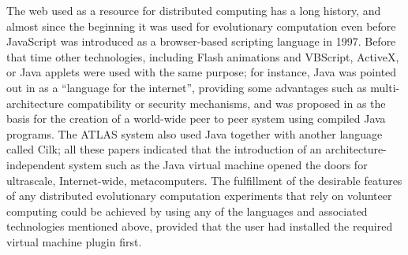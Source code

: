 \documentclass{sig-alternate}
\begin{document}
The web used as a resource for distributed computing has a
long history, and almost since the beginning it was used for
evolutionary computation even before JavaScript was
introduced as a browser-based scripting language in 1997. Before that
time other technologies,
 including Flash animations and VBScript, ActiveX, or Java applets were
used with the same purpose; for instance, Java was pointed out in \cite{soares1998get} as a
``language for the internet'', providing some advantages such as multi-architecture compatibility or
security mechanisms, and was proposed in \cite{chandy1996world} as the
basis for the creation of a world-wide peer to peer system using compiled Java
programs. The ATLAS system
\cite{Baldeschwieler:1996:TIG:504450.504482} also used Java together
with another language called Cilk; all these papers indicated that
the introduction of an architecture-independent system such as the
Java virtual machine opened the doors for ultrascale, Internet-wide,
metacomputers. 
The fulfillment of the desirable features of any distributed evolutionary 
computation experiments that rely on volunteer computing \cite{2016arXiv160101607Manom} could be achieved by using any of the
languages and associated technologies mentioned above, provided that the user had
installed the required virtual machine plugin first. 
\end{document}
